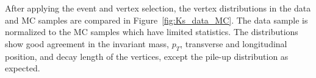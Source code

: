After applying the event and \Ks vertex selection, the \Ks vertex distributions in the data and MC samples are compared in Figure~\ref{fig:Ks_data_MC}. The data sample is normalized to the MC samples which have limited statistics. The distributions show good agreement in the invariant mass, $p_{T}$, transverse and longitudinal position, and decay length of the vertices, except the pile-up distribution as expected.


\begin{figure}[!htb]
    \centering
     \\
      \\

\end{figure}
